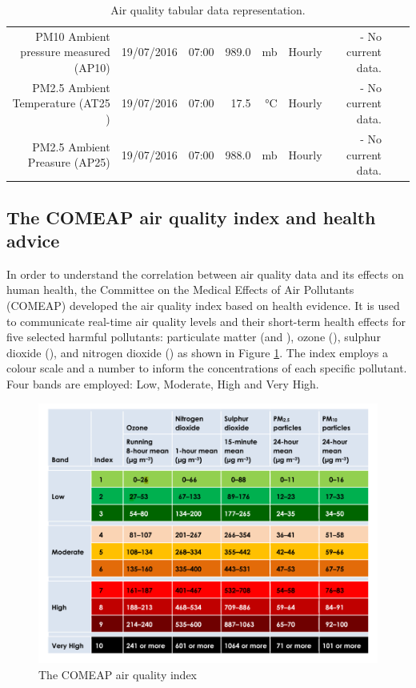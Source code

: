 \begin{table}[ht]
\begin{adjustbox}{width=1.2\textwidth,center=\textwidth}
\begin{tabular}{rlrrrrrrr}
	PM10 Ambient pressure measured (AP10) & 19/07/2016 & 07:00 & 989.0 & mb & Hourly & - No current data. \\
	PM2.5 Ambient Temperature (AT25 ) & 19/07/2016 & 07:00 & 17.5 & °C & Hourly & - No current data. \\
	PM2.5 Ambient Preasure (AP25) & 19/07/2016 & 07:00 & 988.0 & mb & Hourly & - No current data. \\
   \hline
\end{tabular}
\end{adjustbox}
\caption{Air quality tabular data representation. \cite{DepartmentforEnvironment}}
\label{tab:pollution_tabular_data}
\end{table} 

\subsection{The COMEAP air quality index and health advice}
In order to understand the correlation between air quality data and its effects on human health, the Committee on the Medical Effects of Air Pollutants (COMEAP) developed the air quality index based on health evidence. It is used to communicate real-time air quality levels and their short-term health effects for five selected harmful pollutants: particulate matter (\PMTEN and \PMTWO), ozone (\OTHREE), sulphur dioxide (\SOTWO), and nitrogen dioxide (\NOTWO) as shown in Figure \ref{fig:air_quality_index}. The index employs a colour scale and a number  to inform the concentrations of each specific pollutant. Four bands are employed: Low, Moderate, High and Very High. 

\begin{figure}[H]
\begin{adjustbox}{width=1\textwidth,center=\textwidth}
  \centering
  \includegraphics[scale=.8]{images/air_quality_index.png}
\end{adjustbox}
  \caption[The COMEAP air quality index]{The COMEAP air quality index \cite{HealthProtectionAgencyfortheCommitteeontheMedicalEffectsofAirPollutants2011}}
  \label{fig:air_quality_index}
\end{figure}

